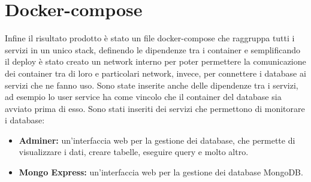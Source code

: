 \section{Docker-compose}

Infine il risultato prodotto è stato un file docker-compose che raggruppa tutti i servizi in un unico stack, definendo le dipendenze tra i container e semplificando il deploy
è stato creato un network interno per poter permettere la comunicazione dei container tra di loro e particolari network, invece, per connettere i database ai servizi che ne fanno uso.
Sono state inserite anche delle dipendenze tra i servizi, ad esempio lo user service ha come vincolo che il container del database sia avviato prima di esso. 
\vspace{0.5cm}
Sono stati inseriti dei servizi che permettono di monitorare i database: 
\begin{itemize}
    \item \textbf{Adminer:} un'interfaccia web per la gestione dei database, che permette di visualizzare i dati, creare tabelle, eseguire query e molto altro.
    \item \textbf{Mongo Express:} un'interfaccia web per la gestione dei database MongoDB.
\end{itemize}

